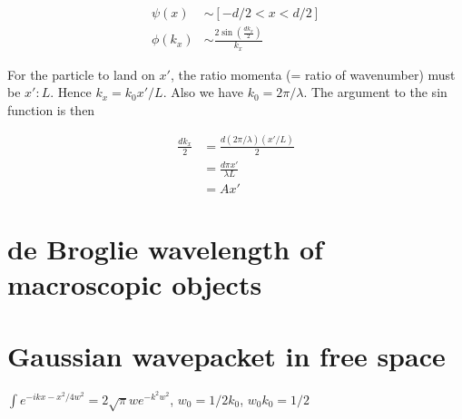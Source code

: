 \documentclass{article}
\newcommand{\<}{\langle}
\renewcommand{\>}{\rangle}
\begin{document}
\begin{align*}
\psi(x) &\sim [-d/2 < x < d/2] \\
\phi(k_x) &\sim \frac{2\sin(\frac{dk_x}{2})}{k_x}
\end{align*}

For the particle to land on $x'$, the ratio momenta (= ratio of wavenumber) must be $x' : L$. Hence $k_x = k_0 x' / L$. Also we have $k_0 = 2\pi/\lambda$. The argument to the sin function is then

\begin{align*}
\frac{dk_x}{2} &= \frac{d (2\pi/\lambda) (x' / L)}{2} \\
&= \frac{d \pi x'}{\lambda L} \\
&= Ax'
\end{align*}

\section{de Broglie wavelength of macroscopic objects}
\section{Gaussian wavepacket in free space}

$\int e^{-ikx - x^2 / 4w^2} = 2 \sqrt\pi w e^{-k^2 w ^2}$,
$w_0 = 1/2k_0$,
$w_0 k_0 = 1/2$
\end{document}
